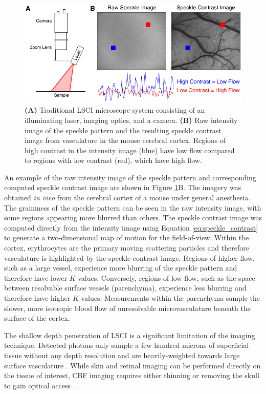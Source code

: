 \begin{figure}
    \includegraphics{figures/chapter_1/lsci_schematic.pdf}
    \caption{
        \label{fig:lsci_schematic}
        \textbf{(A)} Traditional LSCI microscope system consisting of an illuminating laser, imaging optics, and a camera. \textbf{(B)} Raw intensity image of the speckle pattern and the resulting speckle contrast image from vasculature in the mouse cerebral cortex. Regions of high contrast in the intensity image (blue) have low flow compared to regions with low contrast (red), which have high flow.
    }
\end{figure}

An example of the raw intensity image of the speckle pattern and corresponding computed speckle contrast image are shown in Figure \ref{fig:lsci_schematic}B. The imagery was obtained \textit{in vivo} from the cerebral cortex of a mouse under general anesthesia. The graininess of the speckle pattern can be seen in the raw intensity image, with some regions appearing more blurred than others. The speckle contrast image was computed directly from the intensity image using Equation \ref{eq:speckle_contrast} to generate a two-dimensional map of motion for the field-of-view. Within the cortex, erythrocytes are the primary moving scattering particles and therefore vasculature is highlighted by the speckle contrast image. Regions of higher flow, such as a large vessel, experience more blurring of the speckle pattern and therefore have lower $K$ values. Conversely, regions of low flow, such as the space between resolvable surface vessels (parenchyma), experience less blurring and therefore have higher $K$ values. Measurements within the parenchyma sample the slower, more isotropic blood flow of unresolvable microvasculature beneath the surface of the cortex.

The shallow depth penetration of LSCI is a significant limitation of the imaging technique. Detected photons only sample a few hundred microns of superficial tissue without any depth resolution and are heavily-weighted towards large surface vasculature \cite{Davis:2014kc}. While skin and retinal imaging can be performed directly on the tissue of interest, CBF imaging requires either thinning or removing the skull to gain optical access \cite{Boas:2010vr}.

